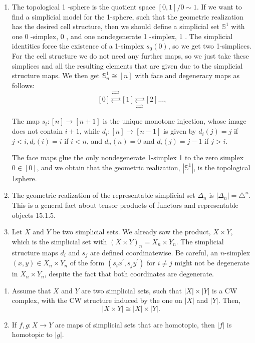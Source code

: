 \begin{example}
    \begin{enumerate}
        \item The topological 1 -sphere is the quotient space $[0,1] / 0 \sim 1$. If we want to find a simplicial model for the 1-sphere, such that the geometric realization has the desired cell structure, then we should define a simplicial set $\mathbb{S}^1$ with one 0 -simplex, 0 , and one nondegenerate 1 -simplex, 1 . The simplicial identities force the existence of a 1-simplex $s_0(0)$, so we get two 1-simplices. For the cell structure we do not need any further maps, so we just take these simplices and all the resulting elements that are given due to the simplicial structure maps. We then get $\mathbb{S}_n^1 \cong[n]$ with face and degeneracy maps as follows:
        $$
        [0] \stackrel{\rightleftarrows}{\rightleftarrows}[1] \underset{\rightleftarrows}{\rightleftarrows}[2] \ldots,
        $$
        
        The map $s_i:[n] \rightarrow[n+1]$ is the unique monotone injection, whose image does not contain $i+1$, while $d_i:[n] \rightarrow[n-1]$ is given by $d_i(j)=j$ if $j<i, d_i(i)=i$ if $i<n$, and $d_n(n)=0$ and $d_i(j)=j-1$ if $j>i$.
        
        The face maps glue the only nondegenerate 1-simplex 1 to the zero simplex $0 \in[0]$, and we obtain that the geometric realization, $\left|\mathbb{S}^1\right|$, is the topological 1sphere.
        \item The geometric realization of the representable simplicial set $\Delta_n$ is $\left|\Delta_n\right|=\triangle^n$. This is a general fact about tensor products of functors and representable objects 15.1.5. \item Let $X$ and $Y$ be two simplicial sets. We already saw the product, $X \times Y$, which is the simplicial set with $(X \times Y)_n=X_n \times Y_n$. The simplicial structure maps $d_i$ and $s_j$ are defined coordinatewise. Be careful, an $n$-simplex $(x, y) \in X_n \times Y_n$ of the form $\left(s_i x^{\prime}, s_j y^{\prime}\right)$ for $i \neq j$ might not be degenerate in $X_n \times Y_n$, despite the fact that both coordinates are degenerate.
    \end{enumerate}
\end{example}

\begin{prop}
    \begin{enumerate}
        \item Assume that $X$ and $Y$ are two simplicial sets, such that $|X| \times|Y|$ is a CW complex, with the CW structure induced by the one on $|X|$ and $|Y|$. Then,
        $$
        |X \times Y| \cong|X| \times|Y| \text {. }
        $$
        \item If $f, g: X \rightarrow Y$ are maps of simplicial sets that are homotopic, then $|f|$ is homotopic to $|g|$.
    \end{enumerate}
\end{prop}

